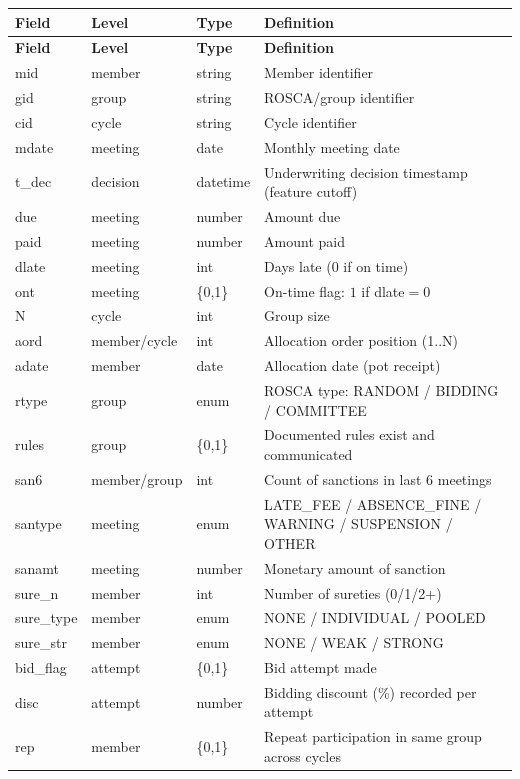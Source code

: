 \documentclass[11t]{article}
\begin{document}
\begin{longtable}{p{}p{}p{}p{}}
\toprule
\textbf{Field} & \textbf{Level} & \textbf{Type} & \textbf{Definition}\\
\midrule
\endfirsthead
\toprule
\textbf{Field} & \textbf{Level} & \textbf{Type} & \textbf{Definition}\\
\midrule
\endhead
mid & member & string & Member identifier \\
gid & group & string & ROSCA/group identifier \\
cid & cycle & string & Cycle identifier \\
mdate & meeting & date & Monthly meeting date \\
t\_dec & decision & datetime & Underwriting decision timestamp (feature cutoff) \\
due & meeting & number & Amount due \\
paid & meeting & number & Amount paid \\
dlate & meeting & int & Days late (0 if on time) \\
ont & meeting & \{0,1\} & On-time flag: $1$ if dlate$=0$ \\
N & cycle & int & Group size \\
aord & member/cycle & int & Allocation order position (1..N) \\
adate & member & date & Allocation date (pot receipt) \\
rtype & group & enum & ROSCA type: RANDOM / BIDDING / COMMITTEE \\
rules & group & \{0,1\} & Documented rules exist and communicated \\
san6 & member/group & int & Count of sanctions in last 6 meetings \\
santype & meeting & enum & LATE\_FEE / ABSENCE\_FINE / WARNING / SUSPENSION / OTHER \\
sanamt & meeting & number & Monetary amount of sanction \\
sure\_n & member & int & Number of sureties (0/1/2+) \\
sure\_type & member & enum & NONE / INDIVIDUAL / POOLED \\
sure\_str & member & enum & NONE / WEAK / STRONG \\
bid\_flag & attempt & \{0,1\} & Bid attempt made \\
disc & attempt & number & Bidding discount (\%) recorded per attempt \\
rep & member & \{0,1\} & Repeat participation in same group across cycles \\

\end{longtable}
\end{document}
